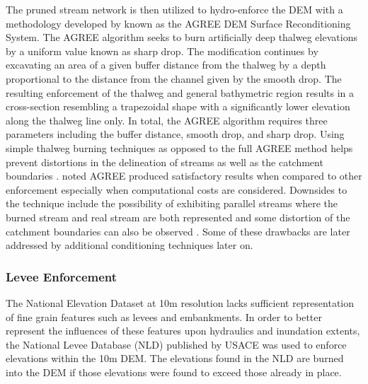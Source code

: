 The pruned stream network is then utilized to hydro-enforce the DEM with a methodology developed by  known as the AGREE DEM Surface Reconditioning System. 
The AGREE algorithm seeks to burn artificially deep thalweg elevations by a uniform value known as sharp drop. 
The modification continues by excavating an area of a given buffer distance from the thalweg by a depth proportional to the distance from the channel given by the smooth drop. 
The resulting enforcement of the thalweg and general bathymetric region results in a cross-section resembling a trapezoidal shape with a significantly lower elevation along the thalweg line only.
In total, the AGREE algorithm requires three parameters including the buffer distance, smooth drop, and sharp drop. 
Using simple thalweg burning techniques as opposed to the full AGREE method helps prevent distortions in the delineation of streams as well as the catchment boundaries \cite{saunders1995grid,saunders1996gis,mizgalewicz1996modeling,hellweger1997agree,quenzer1998gis,baker2006comparison}.
 noted AGREE produced satisfactory results when compared to other enforcement especially when computational costs are considered. 
Downsides to the technique include the possibility of exhibiting parallel streams where the burned stream and real stream are both represented \cite{hellweger1997agree,saunders1999preparation} and some distortion of the catchment boundaries can also be observed \cite{saunders1999preparation,saunders1996gis}. Some of these drawbacks are later addressed by additional conditioning techniques later on.
%
\subsubsection{Levee Enforcement}
%
The National Elevation Dataset at 10m resolution lacks sufficient representation of fine grain features such as levees and embankments.
In order to better represent the influences of these features upon hydraulics and inundation extents, the National Levee Database (NLD) published by USACE was used to enforce elevations within the 10m DEM.
The elevations found in the NLD are burned into the DEM if those elevations were found to exceed those already in place.
%
